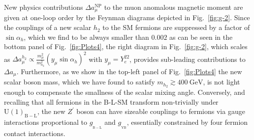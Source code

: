 \documentclass[10pt]{report}
\newcommand{\g}[2]{g_{_\mathrm{#1}}^{#2}}
\newcommand{\ro}[1]{\textrm{#1}}
\newcommand{\U}[1]{\mathrm{U}(1)_{\mathrm{#1}}}
\begin{document}
New physics contributions $\Delta a_\mu^{\ro{NP}}$ to the muon anomalous magnetic moment are given at one-loop order by the Feynman diagrams depicted in Fig.~\ref{fig:g-2}.
%
Since the couplings of a new scalar $h_2$ to the SM fermions are suppressed by a factor of $\sin \alpha_h$, which we find to be always smaller than $0.002$ as can be seen in the bottom panel of Fig.~\ref{fig:Plots4}, the right diagram in Fig.~\ref{fig:g-2}, which scales as $\Delta a_\mu^{h_2} \propto \tfrac{m_\mu^2}{m_{h_2}^2}\left(y_\mu \sin \alpha_h\right)^2$ with $y_\mu = Y_e^{22}$, provides sub-leading contributions to $\Delta a_\mu$.
%
Furthermore, as we show in the top-left panel of Fig.~\ref{fig:Plots4} the new scalar boson mass, which we have found to satisfy $m_{h_2} \gtrsim 400~\ro{GeV}$, is not light enough to compensate the smallness of the scalar mixing angle. Conversely, and recalling that all fermions in the B-L-SM transform non-trivially under $\U{B-L}$, the new $Z^\prime$ boson can have sizeable couplings to fermions via gauge interactions proportional to $\g{B-L}{}$ and $\g{YB}{}$, essentially constrained by four fermion contact interactions. 
\end{document}
